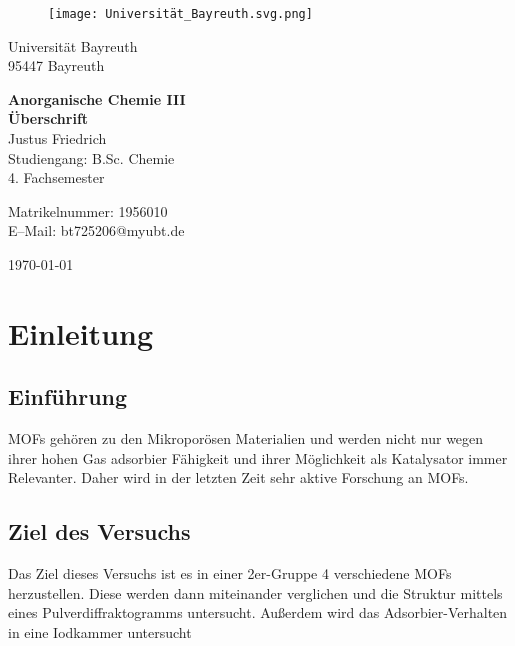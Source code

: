 \documentclass[12pt, a4paper]{article}
\begin{document}
\begin{figure}
    \texttt{[image: Universität\_Bayreuth.svg.png]}
\end{figure}



{\raggedright Universität Bayreuth\\  95447 Bayreuth}


\vspace{5cm}

\begin{center}
{\LARGE\bf{Anorganische Chemie III}} \\  
\vspace{1cm}
{\Large\bf{Überschrift}}\\
\vspace{0.5cm}
{\large Justus Friedrich\\}
{Studiengang: B.Sc. Chemie\\}
{4. Fachsemester}
\end{center}





\thispagestyle{empty}
\begin{center}
{\small Matrikelnummer: 1956010 \\
E–Mail:  bt725206@myubt.de}
\end{center}

\vspace{5cm}

\today


\newpage
\tableofcontents
\thispagestyle{empty}


\newpage
\setcounter{page}{1}
\section{Einleitung}



\subsection{Einführung}
{MOFs gehören zu den Mikroporösen Materialien und werden nicht nur wegen ihrer hohen Gas adsorbier Fähigkeit und ihrer Möglichkeit als Katalysator 
immer Relevanter. Daher wird in der letzten Zeit sehr aktive Forschung an MOFs.\cite{ThomasHillman.2018}

}

\subsection{Ziel des Versuchs}
{Das Ziel dieses Versuchs ist es in einer 2er-Gruppe 4 verschiedene MOFs herzustellen. Diese werden dann miteinander verglichen und die Struktur mittels eines 
Pulverdiffraktogramms untersucht. Außerdem wird das Adsorbier-Verhalten in eine Iodkammer untersucht



}
\end{document}
